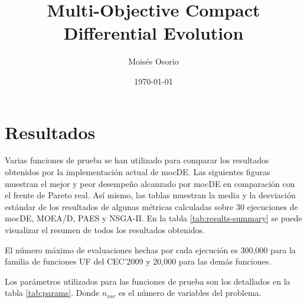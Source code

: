 \documentclass[english]{article}
\begin{document}
\makeatletter
\title{Multi-Objective Compact Differential Evolution}
\author{Moisés Osorio}
\date{\today}
\makeatother
\maketitle

\section*{Resultados}
Varias funciones de prueba se han utilizado para comparar los resultados obtenidos por la implementación actual de mocDE. Las siguientes figuras muestran el mejor y peor desempeño alcanzado por mocDE en comparación con el frente de Pareto real. Así mismo, las tablas muestran la media y la desviación estándar de los resultados de algunas métricas calculadas sobre 30 ejecuciones de mocDE, MOEA/D, PAES y NSGA-II. En la tabla \ref{tab:results-summary} se puede visualizar el resumen de todos los resultados obtenidos.

El número máximo de evaluaciones hechas por cada ejecución es 300,000 para la familia de funciones UF del CEC'2009 y 20,000 para las demás funciones.

Los parámetros utilizados para las funciones de prueba son los detallados en la tabla \ref{tab:params}. Donde $n_{var}$ es el número de variables del problema.
\end{document}

